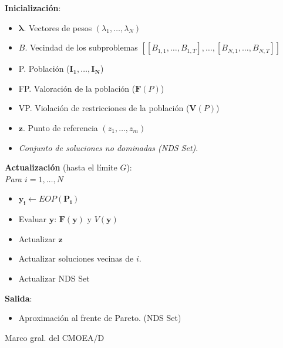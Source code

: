 \begin{minipage}[H]{0.47\linewidth}
\begin{algorithm}[H]
 \textbf{Inicialización}:
    \begin{itemize}
        \vspace{0.15cm}\item $\boldsymbol{\lambda}$. Vectores de pesos $(\lambda_1, \dots, \lambda_N)$
        \vspace{0.15cm}\item $B$. Vecindad de los subproblemas $[[B_{1,1}, \dots, B_{1,T}], \dots, [B_{N,1}, \dots, B_{N,T}] ]$
        \vspace{0.15cm}\item P. Población ($\boldsymbol{I_1}, \dots, \boldsymbol{I_N}$)
        \vspace{0.15cm}\item FP. Valoración de la población ($\boldsymbol{F}(P)$)
        \vspace{0.15cm}\item VP. Violación de restricciones de la población ($\boldsymbol{V}(P)$)
        \vspace{0.15cm}\item $\boldsymbol{z}$. Punto de referencia $(z_1, \dots, z_m)$
        \vspace{0.15cm}\item \textit{Conjunto de soluciones no dominadas (NDS Set)}. 
    \end{itemize}
    
\vspace{0.3cm}
  
 \textbf{Actualización} (hasta el límite $G$):\\
    \textit{Para $i=1, \dots, N$}
        \begin{itemize}
            \vspace{0.15cm}\item $\boldsymbol{y_i} \gets EOP(\boldsymbol{P_i})$
            
            \vspace{0.15cm}\item Evaluar $\boldsymbol{y}$: $\boldsymbol{F}(\boldsymbol{y})$ y $V(\boldsymbol{y})$
            \vspace{0.15cm}\item Actualizar $\boldsymbol{z}$
            \vspace{0.15cm}\item Actualizar soluciones vecinas de $i$.
            \vspace{0.15cm}\item Actualizar NDS Set
        \end{itemize}
    
     
    \vspace{0.3cm} 
    
    \textbf{Salida}:
    \begin{itemize}
        \item Aproximación al frente de Pareto. (NDS Set)
    \end{itemize}
 \caption{Marco gral. del CMOEA/D}
 \label{alg:1}
\end{algorithm}
\end{minipage}\\

